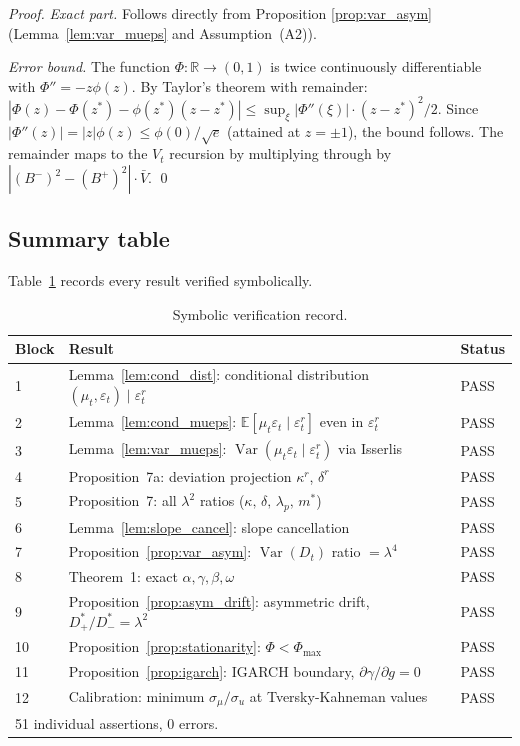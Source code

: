 \documentclass[12pt,a4paper]{article}
\theoremstyle{definition}
\begin{document}
\begin{proof}
\textit{Exact part.} Follows directly from Proposition
\ref{prop:var_asym} (Lemma~\ref{lem:var_mueps} and
Assumption~(A2)).

\textit{Error bound.} The function $\Phi: \mathbb{R} \to (0,1)$
is twice continuously differentiable with $\Phi'' =
-z\phi(z)$. By Taylor's theorem with remainder:
$|\Phi(z) - \Phi(z^*) - \phi(z^*)(z-z^*)| \leq
\sup_\xi|\Phi''(\xi)| \cdot (z-z^*)^2/2$. Since
$|\Phi''(z)| = |z|\phi(z) \leq \phi(0)/\sqrt{e}$ (attained at
$z = \pm 1$), the bound follows. The remainder maps to the
$V_t$ recursion by multiplying through by $|(B^-)^2 -
(B^+)^2|\cdot\bar{V}$.
\qed
\end{proof}

\subsection{Summary table}

Table~\ref{tab:sympy_verification} records every result
verified symbolically.

\begin{table}[ht]
\centering
\caption{Symbolic verification record.}
\label{tab:sympy_verification}
\begin{tabular}{l l l}
\toprule
Block & Result & Status \\
\midrule
1 & Lemma~\ref{lem:cond_dist}: conditional distribution
    $(\mu_t,\varepsilon_t)\mid\varepsilon^r_t$ & PASS \\
2 & Lemma~\ref{lem:cond_mueps}: $\mathbb{E}[\mu_t\varepsilon_t\mid\varepsilon^r_t]$
    even in $\varepsilon^r_t$ & PASS \\
3 & Lemma~\ref{lem:var_mueps}: $\operatorname{Var}(\mu_t\varepsilon_t\mid\varepsilon^r_t)$
    via Isserlis & PASS \\
4 & Proposition~7a: deviation projection $\kappa^r$, $\delta^r$ & PASS \\
5 & Proposition~7: all $\lambda^2$ ratios
    ($\kappa,\,\delta,\,\lambda_p,\,m^*$) & PASS \\
6 & Lemma~\ref{lem:slope_cancel}: slope cancellation & PASS \\
7 & Proposition~\ref{prop:var_asym}: $\operatorname{Var}(D_t)$ ratio $=\lambda^4$ & PASS \\
8 & Theorem~1: exact $\alpha,\gamma,\beta,\omega$ & PASS \\
9 & Proposition~\ref{prop:asym_drift}: asymmetric drift,
    $D^*_+/D^*_- = \lambda^2$ & PASS \\
10 & Proposition~\ref{prop:stationarity}: $\Phi < \Phi_{\max}$ & PASS \\
11 & Proposition~\ref{prop:igarch}: IGARCH boundary,
     $\partial\gamma/\partial g = 0$ & PASS \\
12 & Calibration: minimum $\sigma_\mu/\sigma_u$ at
     Tversky-Kahneman values & PASS \\
\bottomrule
\multicolumn{3}{l}{\footnotesize 51 individual assertions, 0 errors.}
\end{tabular}
\end{table}
\end{document}
